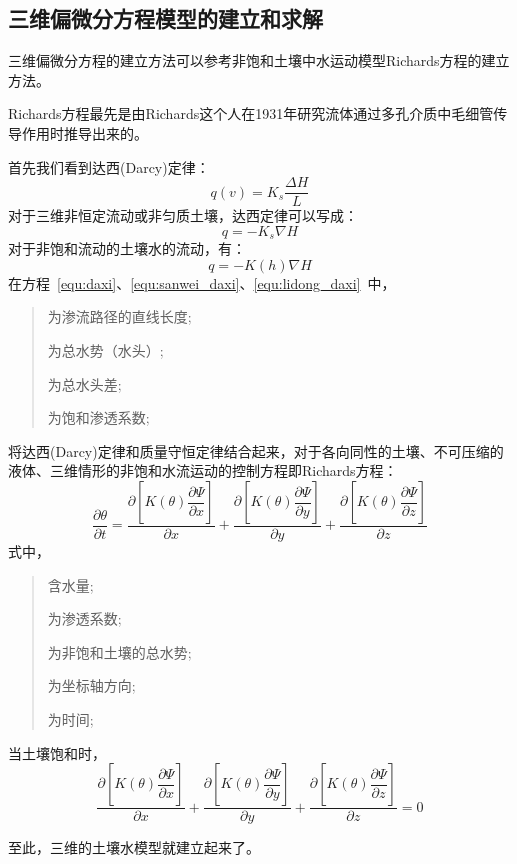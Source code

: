 \documentclass[a4paper,cs4size,adobefonts,fancyhdr]{ctexart}[2005/11/25]
\newcommand{\upcite}[1]{\textsuperscript{\textsuperscript{\cite{#1}}}}
\numberwithin{equation}{section} %
\begin{document}
\subsection{三维偏微分方程模型的建立和求解}
三维偏微分方程的建立方法可以参考非饱和土壤中水运动模型Richards方程的建立方法\upcite{张培文2002}。\par
Richards方程最先是由Richards这个人在1931年研究流体通过多孔介质中毛细管传导作用时推导出来的。\par
首先我们看到达西(Darcy)定律\upcite{王玉珉2004}：
\begin{equation}\label{equ:daxi}
q(v)=K_s\dfrac{\Delta H}{L}
\end{equation}
对于三维非恒定流动或非匀质土壤，达西定律可以写成：
\begin{equation}\label{equ:sanwei_daxi}
q=-K_s\nabla H
\end{equation}
对于非饱和流动的土壤水的流动，有：
\begin{equation}\label{equ:lidong_daxi}
q=-K(h)\nabla H
\end{equation}
在方程~\ref{equ:daxi}、\ref{equ:sanwei_daxi}、\ref{equ:lidong_daxi}~中，
\begin{quote}
\begin{description}\setlength{\itemsep}{0em}
	\item[$L$]为渗流路径的直线长度;
	\item[$H$]为总水势（水头）;
	\item[$\Delta H$]为总水头差;
	\item[$K_s$]为饱和渗透系数;
\end{description}
\end{quote}\par
将达西(Darcy)定律和质量守恒定律结合起来，对于各向同性的土壤、不可压缩的液体、三维情形的非饱和水流运动的控制方程即Richards方程：
\begin{equation}\label{equ:Richards_3}
\dfrac{\partial \theta}{\partial t}=\dfrac{\partial \left[K(\theta)\dfrac{\partial\Psi}{\partial x}\right]}{\partial x}+\dfrac{\partial \left[K(\theta)\dfrac{\partial\Psi}{\partial y}\right]}{\partial y}+\dfrac{\partial \left[K(\theta)\dfrac{\partial\Psi}{\partial  z}\right]}{\partial z}
\end{equation}
式中，
\begin{quote}
\begin{description}\setlength{\itemsep}{0em}
	\item[$\theta$]含水量;
	\item[$K$]为渗透系数;
	\item[$\Psi$]为非饱和土壤的总水势;
	\item[$x$、$y$、$z$]为坐标轴方向;
	\item[$t$]为时间;
\end{description}
\end{quote}
当土壤饱和时，
\begin{equation}
\dfrac{\partial \left[K(\theta)\dfrac{\partial\Psi}{\partial x}\right]}{\partial x}+\dfrac{\partial \left[K(\theta)\dfrac{\partial\Psi}{\partial y}\right]}{\partial y}+\dfrac{\partial \left[K(\theta)\dfrac{\partial\Psi}{\partial  z}\right]}{\partial z}=0
\end{equation}\par
至此，三维的土壤水模型就建立起来了。
\end{document}
